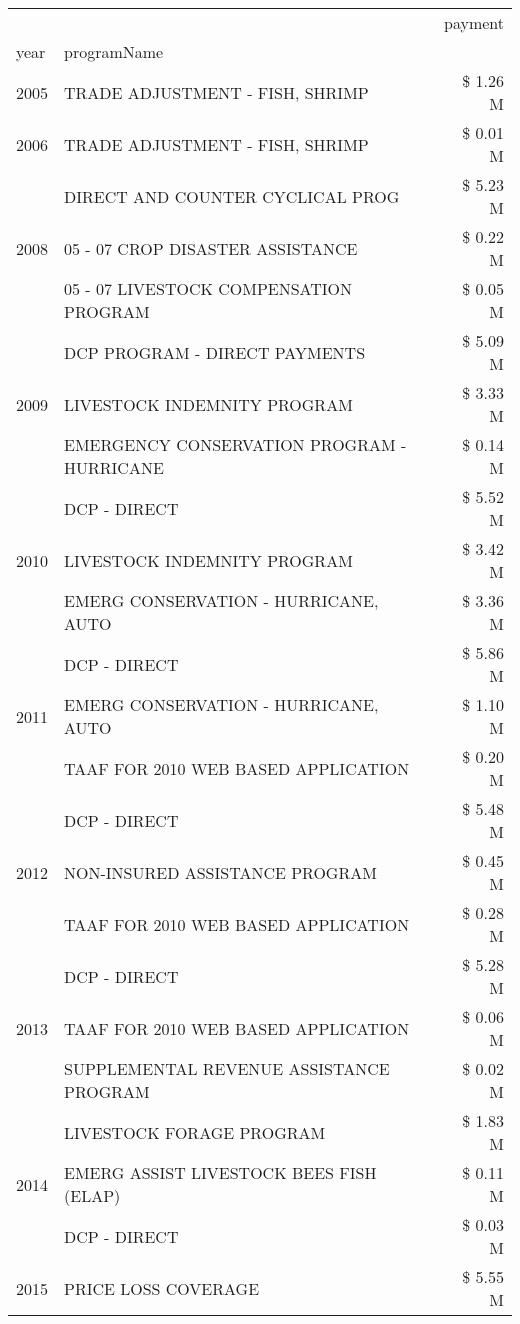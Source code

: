 \begin{tabular}{llr}
\toprule
 &  & payment \\
year & programName &  \\
\midrule
2005 & TRADE ADJUSTMENT - FISH, SHRIMP & \$ 1.26 M \\
\cline{1-3}
2006 & TRADE ADJUSTMENT - FISH, SHRIMP & \$ 0.01 M \\
\cline{1-3}
\multirow[t]{3}{*}{2008} & DIRECT AND COUNTER CYCLICAL PROG & \$ 5.23 M \\
 & 05 - 07 CROP DISASTER ASSISTANCE & \$ 0.22 M \\
 & 05 - 07 LIVESTOCK COMPENSATION PROGRAM & \$ 0.05 M \\
\cline{1-3}
\multirow[t]{3}{*}{2009} & DCP PROGRAM - DIRECT PAYMENTS & \$ 5.09 M \\
 & LIVESTOCK INDEMNITY PROGRAM & \$ 3.33 M \\
 & EMERGENCY CONSERVATION PROGRAM - HURRICANE & \$ 0.14 M \\
\cline{1-3}
\multirow[t]{3}{*}{2010} & DCP - DIRECT & \$ 5.52 M \\
 & LIVESTOCK INDEMNITY PROGRAM & \$ 3.42 M \\
 & EMERG CONSERVATION - HURRICANE, AUTO & \$ 3.36 M \\
\cline{1-3}
\multirow[t]{3}{*}{2011} & DCP - DIRECT & \$ 5.86 M \\
 & EMERG CONSERVATION - HURRICANE, AUTO & \$ 1.10 M \\
 & TAAF FOR 2010 WEB BASED APPLICATION & \$ 0.20 M \\
\cline{1-3}
\multirow[t]{3}{*}{2012} & DCP - DIRECT & \$ 5.48 M \\
 & NON-INSURED ASSISTANCE PROGRAM & \$ 0.45 M \\
 & TAAF FOR 2010 WEB BASED APPLICATION & \$ 0.28 M \\
\cline{1-3}
\multirow[t]{3}{*}{2013} & DCP - DIRECT & \$ 5.28 M \\
 & TAAF FOR 2010 WEB BASED APPLICATION & \$ 0.06 M \\
 & SUPPLEMENTAL REVENUE ASSISTANCE PROGRAM & \$ 0.02 M \\
\cline{1-3}
\multirow[t]{3}{*}{2014} & LIVESTOCK FORAGE PROGRAM & \$ 1.83 M \\
 & EMERG ASSIST LIVESTOCK BEES FISH (ELAP) & \$ 0.11 M \\
 & DCP - DIRECT & \$ 0.03 M \\
\cline{1-3}
\multirow[t]{3}{*}{2015} & PRICE LOSS COVERAGE & \$ 5.55 M \\

\end{tabular}
